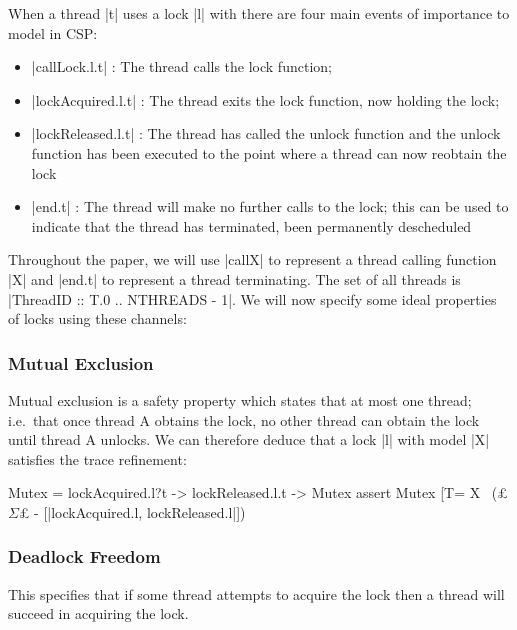 When a thread |t| uses a lock |l| with there are four main events of importance to model in CSP:

\begin{itemize}
  \item |callLock.l.t| : The thread calls the lock function;
  \item |lockAcquired.l.t| : The thread exits the lock function, now holding the lock;
  \item |lockReleased.l.t| : The thread has called the unlock function and the unlock function has been executed to the point where a thread can now reobtain the lock
  \item |end.t| : The thread will make no further calls to the lock; this can be used to indicate that the thread has terminated, been permanently descheduled
\end{itemize}

Throughout the paper, we will use |callX| to represent a thread calling function |X| and |end.t| to represent a thread terminating. The set of all threads is |ThreadID :: T.{0 .. NTHREADS - 1}|. We will now specify some ideal properties of locks using these channels:

\subsubsection{Mutual Exclusion}\label{mutual-exclusion}
Mutual exclusion is a safety property which states that at most one thread; i.e.~that once thread A obtains the lock, no other thread can obtain the lock until thread A unlocks. We can therefore deduce that a lock |l| with model |X| satisfies the trace refinement:  

  
  \begin{cspm}
    Mutex = lockAcquired.l?t -> lockReleased.l.t -> Mutex
    assert Mutex [T= X \ (£$\Sigma$£ - [|lockAcquired.l, lockReleased.l|])
  \end{cspm}

\subsubsection{Deadlock Freedom}\label{deadlock-freedom}
This specifies that if some thread attempts to acquire the lock then a thread will succeed in acquiring the lock\cite{TAoMP}. 

